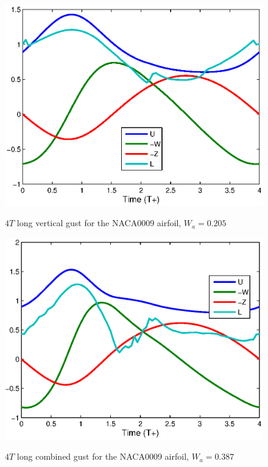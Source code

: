 \begin{figure}
  \begin{center}
   \scalebox{1.0}
   {\includegraphics{./Figures/Windtype=1_Tg=4_Wg=0p205_UAV_alphamax=12.eps}}
  \end{center}
  \caption{$4T$ long vertical gust for the NACA0009 airfoil, $W_a=0.205$}
  \label{fig:vertical_optimization_UAV}
\end{figure}


\begin{figure}[h]
  \begin{center}
    \scalebox{1.0}
    {\includegraphics{./Figures/Windtype=3_Tg=4_Wg=0p387_UAV_alphamax=12.eps}}
  \end{center}
  \caption{$4T$ long combined gust for the NACA0009 airfoil, $W_a=0.387$}
  \label{fig:combined_optimization_UAV}
\end{figure}
\FloatBarrier

